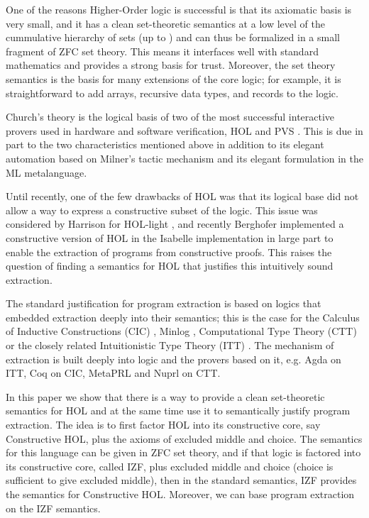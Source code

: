 \documentclass{LMCS}
\begin{document}
One of the reasons Higher-Order logic is successful is that its axiomatic
basis is very small, and it has a clean set-theoretic semantics at a low
level of the cummulative hierarchy of sets (up to ) and can
thus be formalized in a small fragment of ZFC set theory.
This means it interfaces well with standard mathematics and
provides a strong basis for trust.  Moreover, the set theory semantics
is the basis for many extensions of the core logic; for example, it is
straightforward to add arrays, recursive data types, and records to the logic. 

Church's theory is the logical basis of two of the most successful
interactive provers used in hardware and software verification, HOL
\cite{GM93} and PVS \cite{ORS92}.
This is due in part to the two characteristics mentioned above in addition
to its elegant automation based on Milner's tactic mechanism and its elegant
formulation in the ML metalanguage.

Until recently, one of the few drawbacks of HOL was that its logical base did
not allow a way to express a constructive subset of the logic.  This issue
was considered by Harrison for HOL-light \cite{Har96}, and recently
Berghofer implemented a constructive version of HOL in the Isabelle
implementation \cite{Ber04,BN02} in large part to enable the extraction of
programs from constructive proofs.  This raises the question of finding a
semantics for HOL that justifies this intuitively sound extraction.
 
The standard justification for program extraction is based on logics that
embedded extraction deeply into their semantics; this is the case for the
Calculus of Inductive Constructions (CIC) \cite{CP-M90,BC04}, Minlog
\cite{BBS98}, Computational Type Theory (CTT) \cite{ABCEKLM05,book} or the closely related
Intuitionistic Type Theory (ITT) \cite{ML82,NPS90}. The mechanism of
extraction is built deeply into logic and the provers based on it, e.g. Agda
\cite{ACN90} on ITT, Coq \cite{CoqManV8} on CIC, MetaPRL \cite{HNC+03} and
Nuprl \cite{ACEKL00} on CTT.

In this paper we show that there is a way to provide a clean set-theoretic
semantics for HOL and at the same time use it to semantically justify program extraction.
The idea is to first factor HOL into its constructive core, say Constructive
HOL, plus the axioms of excluded middle and choice.  The semantics for this
language can be given in ZFC set theory, and if that logic is factored into
its constructive core, called IZF, plus excluded middle and choice (choice
is sufficient to give excluded middle), then in the standard semantics, IZF
provides the semantics for Constructive HOL.  Moreover, we can base program
extraction on the IZF semantics.
\end{document}
